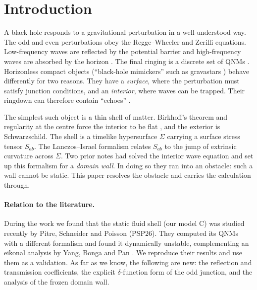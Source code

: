 \documentclass[11pt,a4paper]{article}
\numberwithin{equation}{section}
\begin{document}
\section{Introduction}\label{sec:intro}
A black hole responds to a gravitational perturbation in a well-understood way. The odd and even perturbations obey
the Regge--Wheeler \cite{RW57} and Zerilli \cite{Zerilli70} equations. Low-frequency waves are reflected by the
potential barrier and high-frequency waves are absorbed by the horizon \cite{Vishveshwara70}. The final ringing is a
discrete set of QNMs \cite{Leaver85,KokkotasSchmidt99,Nollert99,BCS09,KonoplyaZhidenko11}. Horizonless compact objects
(``black-hole mimickers'' such as gravastars \cite{MazurMottola04,VisserWiltshire04,ChirentiRezzolla07,Pani09}) behave
differently for two reasons. They have a \emph{surface}, where the perturbation must satisfy junction conditions, and an
\emph{interior}, where waves can be trapped. Their ringdown can therefore contain ``echoes''
\cite{Cardoso2016PRL,Cardoso2016PRD,Abedi2017,CardosoPani2019}.

The simplest such object is a thin shell of matter. Birkhoff's theorem and regularity at the centre force the interior
to be flat \cite{ondas}, and the exterior is Schwarzschild. The shell is a timelike hypersurface $\Sigma$ carrying a
surface stress tensor $S_{ab}$. The Lanczos--Israel formalism \cite{Lanczos24,Israel66,Poisson04,IS84} relates $S_{ab}$
to the jump of extrinsic curvature across $\Sigma$. Two prior notes \cite{ondas,burbuja} had solved the interior wave
equation and set up this formalism for a \emph{domain wall}. In doing so they ran into an obstacle: such a wall cannot
be static. This paper resolves the obstacle and carries the calculation through.

\paragraph{Relation to the literature.} During the work we found that the static fluid shell (our model C) was studied
recently by Pitre, Schneider and Poisson \cite{PSP26} (PSP26). They computed its QNMs with a different formalism and
found it dynamically unstable, complementing an eikonal analysis by Yang, Bonga and Pan \cite{YBP23}. We reproduce
their results and use them as a validation. As far as we know, the following are new: the reflection and transmission
coefficients, the explicit $\delta$-function form of the odd junction, and the analysis of the frozen domain wall.
\end{document}
